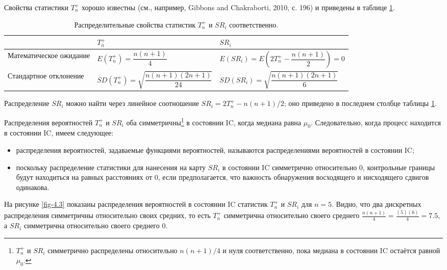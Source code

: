 Свойства статистики \(T_n^+\) хорошо известны (см., например, Gibbons and Chakraborti, 2010, с. 196) и приведены в таблице \ref{tab:4.3}.

\begin{table}[!ht]
	\centering
	\caption{Распределительные свойства статистик \(T_n^+\) и \(SR_i\) соответственно.}
	\label{tab:4.3}
	\begin{tabular}{@{}lll@{}}
		\toprule
		 & \(T_n^+\) & \(SR_i\) \\
		\midrule
		Математическое ожидание & \(E(T_n^+) = \dfrac{n(n + 1)}{4}\) & \(E(SR_i) = E\left(2T_n^+ - \dfrac{n(n+1)}{2}\right) = 0\) \\
		\midrule
		Стандартное отклонение & \(SD(T_n^+) = \sqrt{\dfrac{n(n + 1)(2n + 1)}{24}}\) & \(SD(SR_i) = \sqrt{\dfrac{n(n + 1)(2n + 1)}{6}}\) \\
		\bottomrule
	\end{tabular}
\end{table}

Распределение \(SR_i\) можно найти через линейное соотношение \(SR_i = 2T_n^+ - n(n + 1)/2\); оно приведено в последнем столбце таблицы \ref{tab:4.3}.

Распределения вероятностей \(T_n^+\) и \(SR_i\) оба симметричны\footnote{\(T_n^+\) и \(SR_i\) симметрично распределены относительно \(n(n + 1)/4\) и нуля соответственно, пока медиана в состоянии IC остаётся равной \(\mu_0\).} в состоянии IC, когда медиана равна \(\mu_0\). Следовательно, когда процесс находится в состоянии IC, имеем следующее:

\begin{itemize}
	\item распределения вероятностей, задаваемые функциями вероятностей, называются распределениями вероятностей в состоянии IC;
	\item поскольку распределение статистики для нанесения на карту \(SR_i\) в состоянии IC симметрично относительно 0, контрольные границы будут находиться на равных расстояниях от 0, если предполагается, что важность обнаружения восходящего и нисходящего сдвигов одинакова.
\end{itemize}

На рисунке \ref{fig-4.3} показаны распределения вероятностей в состоянии IC статистик \(T_n^+\) и \(SR_i\) для \(n = 5\). Видно, что два дискретных распределения симметричны относительно своих средних, то есть \(T_n^+\) симметрична относительно своего среднего \(\frac{n(n + 1)}{4} = \frac{(5)(6)}{4} = 7.5\), а \(SR_i\) симметрична относительно своего среднего 0.

